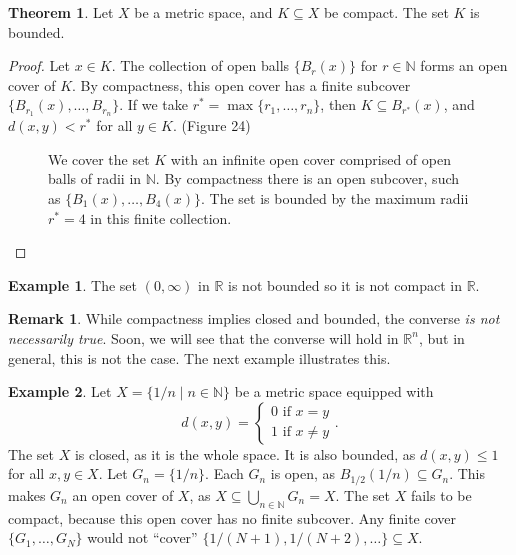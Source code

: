 \documentclass{article}
\newcommand{\N}{\mathbb{N}}
\newcommand{\R}{\mathbb{R}}
\theoremstyle{definition}
\newtheorem{theorem}{Theorem}[section]
\newtheorem{example}{Example}[section]
\newtheorem{remark}{Remark}[section]
\begin{document}
	\begin{theorem}
		Let $ X $ be a metric space, and $ K\subseteq X $ be compact. The set $ K $ is bounded. 
	\end{theorem}
	\begin{proof}
		Let $ x\in K $. The collection of open balls $ \{B_r(x)\} $ for $ r\in\N $ forms an open cover of $ K $. By compactness, this open cover has a finite subcover $ \{B_{r_1}(x),\ldots,B_{r_n}\} $. If we take $ r^*=\max\{r_1,\ldots,r_n\} $, then $ K\subseteq B_{r^*}(x) $, and $ d(x,y)<r^* $ for all $ y\in K $. (Figure 24)
		\begin{figure}[h!]
			\centering
			\caption{We cover the set $ K $ with an infinite open cover comprised of open balls of radii in $ \N $. By compactness there is an open subcover, such as $ \{B_1(x),\ldots,B_4(x)\} $. The set is bounded by the maximum radii $ r^*=4 $ in this finite collection.}  
		\end{figure}
	\end{proof}
	\begin{example}
		The set $ (0,\infty) $ in $ \R $ is not bounded so it is not compact in $ \R $. 
	\end{example}
	\begin{remark}
		While compactness implies closed and bounded, the converse \textit{is not necessarily true}. Soon, we will see that the converse will hold in $ \R^n $, but in general, this is not the case. The next example illustrates this.
	\end{remark}
	\begin{example}
		Let $ X=\{1/n\mid n\in\N\} $ be a metric space equipped with $$ d(x,y)=\begin{cases}
			0\text{ if }x=y\\1\text{ if }x\neq y
		\end{cases}.$$
		The set $ X $ is closed, as it is the whole space. It is also bounded, as $ d(x,y)\le 1 $ for all $ x,y\in X $. Let $ G_n=\{1/n\} $. Each $ G_n $ is open, as $ B_{1/2}(1/n)\subseteq G_n $. This makes $ G_n $ an open cover of $ X $, as $ X\subseteq\bigcup_{n\in \N} G_n=X $. The set $ X $ fails to be compact, because this open cover has no finite subcover. Any finite cover $ \{G_{1},\ldots,G_{N}\} $ would not ``cover''  $ \{1/(N+1),1/(N+2),\ldots\}\subseteq X $.	
	\end{example}
	
\end{document}
